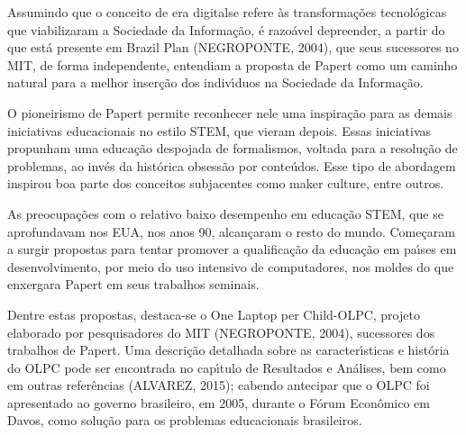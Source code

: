 \documentclass[
12pt,		%
openright,	%
twoside,  %
a4paper,			%
chapter=TITLE,		%
english,			%
french,				%
spanish,			%
brazil				%
]{USPSC-classe/USPSC}
\begin{document}
Assumindo que o conceito de \textquotedbl era digital\textquotedbl  se refere \`as transforma\c{c}\~oes tecnol\'ogicas que viabilizaram a \textquotedbl Sociedade da Informa\c{c}\~ao\textquotedbl ,  \'e razo\'avel depreender, a partir do que est\'a presente em Brazil Plan  (NEGROPONTE, 2004), que seus sucessores no MIT, de forma independente, entendiam a proposta de Papert como um caminho natural para a melhor inser\c{c}\~ao dos indiv\'{\i}duos na Sociedade da Informa\c{c}\~ao.

















O pioneirismo de Papert permite reconhecer nele uma inspira\c{c}\~ao para as demais iniciativas educacionais no estilo STEM, que vieram depois. Essas iniciativas propunham uma educa\c{c}\~ao despojada de formalismos, voltada para a resolu\c{c}\~ao de problemas, ao inv\'es da hist\'orica obsess\~ao por conte\'udos. Esse tipo de abordagem inspirou boa parte dos conceitos subjacentes como \textquotedbl maker culture\textquotedbl , entre outros.

















As preocupa\c{c}\~oes com o relativo baixo desempenho em  educa\c{c}\~ao STEM, que se aprofundavam nos EUA, nos anos 90, alcan\c{c}aram o resto do mundo. Come\c{c}aram a surgir propostas para tentar promover a qualifica\c{c}\~ao da educa\c{c}\~ao em pa\'{\i}ses em desenvolvimento, por meio do uso intensivo de computadores, nos moldes do que enxergara Papert em seus trabalhos seminais.

















Dentre estas propostas, destaca-se o \textquotedbl One Laptop per Child-OLPC\textquotedbl , projeto elaborado por pesquisadores do MIT  (NEGROPONTE, 2004), sucessores dos trabalhos de Papert. Uma descri\c{c}\~ao detalhada sobre as caracter\'{\i}sticas e hist\'oria do OLPC pode ser encontrada no cap\'{\i}tulo de Resultados e An\'alises, bem como em outras refer\^encias (ALVAREZ, 2015); cabendo antecipar que o OLPC foi apresentado ao governo brasileiro, em 2005, durante o F\'orum Econ\^omico em Davos, como solu\c{c}\~ao para os problemas educacionais brasileiros.
\end{document}
